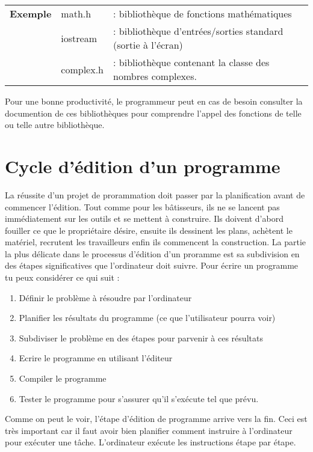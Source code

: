 \documentclass[a4paper, oneside,11pt]{book}
\begin{document}
 \begin{table}[hhhh]
 \begin{tabular}{lll}
 \textbf{Exemple}&math.h &: biblioth\`eque de fonctions math\'ematiques\\
&iostream &: biblioth\`eque d'entr\'ees/sorties standard (sortie \`a l'\'ecran)\\
&complex.h &: biblioth\`eque contenant la classe des nombres complexes. \\
 \end{tabular}
 \end{table}
Pour une bonne productivit\'e, le programmeur peut en cas de besoin consulter la documention de ces biblioth\`eques pour comprendre l'appel des fonctions de telle ou telle autre
biblioth\`eque.


\section{Cycle d'\'edition d'un programme}

La r\'eussite d'un projet de prorammation doit passer par la planification avant de commencer l'\'edition. Tout comme pour les b\^atisseurs, ils ne se lancent pas imm\'ediatement
sur les outils et se mettent \`a construire. Ils doivent d'abord fouiller ce que le propri\'etaire d\'esire, ensuite ils dessinent les plans, ach\`etent le mat\'eriel, recrutent 
les travailleurs enfin ils commencent la construction. La partie la plus d\'elicate dans le processus d'\'edition d'un proramme est sa subdivision en des \'etapes significatives
que l'ordinateur doit suivre. Pour \'ecrire un programme tu peux consid\'erer ce qui suit :

\begin{enumerate}
\item D\'efinir le probl\`eme \`a r\'esoudre par l'ordinateur
\item Planifier les r\'esultats du programme (ce que l'utilisateur pourra voir)
\item Subdiviser le probl\`eme en des \'etapes pour parvenir \`a ces r\'esultats
\item Ecrire le programme en utilisant l'\'editeur
\item Compiler le programme
\item Tester le programme pour s'assurer qu'il s'ex\'ecute tel que pr\'evu.
\end{enumerate}

Comme on peut le voir, l'\'etape d'\'edition de programme arrive vers la fin. Ceci est tr\`es 
important car il faut avoir bien planifier comment instruire \`a l'ordinateur pour 
ex\'ecuter une t\^ache. L'ordinateur ex\'ecute les instructions \'etape par \'etape. 
\end{document}
